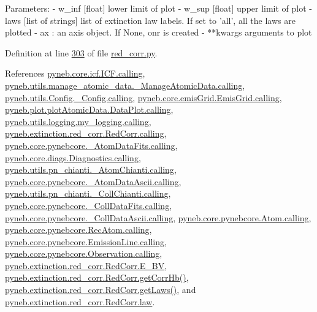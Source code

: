 \begin{DoxyVerb}
\begin{DoxyVerb}
Parameters:
    - w_inf [float] lower limit of plot
    - w_sup [float] upper limit of plot
    - laws [list of strings] list of extinction law labels. If set to 'all', all the laws are plotted
    - ax : an axis object. If None, onr is created
    - **kwargs arguments to plot\end{DoxyVerb}
 

Definition at line \hyperlink{red__corr_8py_source_l00303}{303} of file \hyperlink{red__corr_8py_source}{red\+\_\+corr.\+py}.



References \hyperlink{icf_8py_source_l00016}{pyneb.\+core.\+icf.\+I\+C\+F.\+calling}, \hyperlink{manage__atomic__data_8py_source_l00018}{pyneb.\+utils.\+manage\+\_\+atomic\+\_\+data.\+\_\+\+Manage\+Atomic\+Data.\+calling}, \hyperlink{_config_8py_source_l00032}{pyneb.\+utils.\+Config.\+\_\+\+Config.\+calling}, \hyperlink{emis_grid_8py_source_l00041}{pyneb.\+core.\+emis\+Grid.\+Emis\+Grid.\+calling}, \hyperlink{plot_atomic_data_8py_source_l00042}{pyneb.\+plot.\+plot\+Atomic\+Data.\+Data\+Plot.\+calling}, \hyperlink{logging_8py_source_l00044}{pyneb.\+utils.\+logging.\+my\+\_\+logging.\+calling}, \hyperlink{red__corr_8py_source_l00059}{pyneb.\+extinction.\+red\+\_\+corr.\+Red\+Corr.\+calling}, \hyperlink{pynebcore_8py_source_l00090}{pyneb.\+core.\+pynebcore.\+\_\+\+Atom\+Data\+Fits.\+calling}, \hyperlink{diags_8py_source_l00169}{pyneb.\+core.\+diags.\+Diagnostics.\+calling}, \hyperlink{pn__chianti_8py_source_l00223}{pyneb.\+utils.\+pn\+\_\+chianti.\+\_\+\+Atom\+Chianti.\+calling}, \hyperlink{pynebcore_8py_source_l00311}{pyneb.\+core.\+pynebcore.\+\_\+\+Atom\+Data\+Ascii.\+calling}, \hyperlink{pn__chianti_8py_source_l00414}{pyneb.\+utils.\+pn\+\_\+chianti.\+\_\+\+Coll\+Chianti.\+calling}, \hyperlink{pynebcore_8py_source_l00568}{pyneb.\+core.\+pynebcore.\+\_\+\+Coll\+Data\+Fits.\+calling}, \hyperlink{pynebcore_8py_source_l00918}{pyneb.\+core.\+pynebcore.\+\_\+\+Coll\+Data\+Ascii.\+calling}, \hyperlink{pynebcore_8py_source_l01175}{pyneb.\+core.\+pynebcore.\+Atom.\+calling}, \hyperlink{pynebcore_8py_source_l02572}{pyneb.\+core.\+pynebcore.\+Rec\+Atom.\+calling}, \hyperlink{pynebcore_8py_source_l03263}{pyneb.\+core.\+pynebcore.\+Emission\+Line.\+calling}, \hyperlink{pynebcore_8py_source_l03419}{pyneb.\+core.\+pynebcore.\+Observation.\+calling}, \hyperlink{red__corr_8py_source_l00203}{pyneb.\+extinction.\+red\+\_\+corr.\+Red\+Corr.\+E\+\_\+\+B\+V}, \hyperlink{red__corr_8py_source_l00240}{pyneb.\+extinction.\+red\+\_\+corr.\+Red\+Corr.\+get\+Corr\+Hb()}, \hyperlink{red__corr_8py_source_l00126}{pyneb.\+extinction.\+red\+\_\+corr.\+Red\+Corr.\+get\+Laws()}, and \hyperlink{red__corr_8py_source_l00205}{pyneb.\+extinction.\+red\+\_\+corr.\+Red\+Corr.\+law}.



\end{DoxyVerb}
